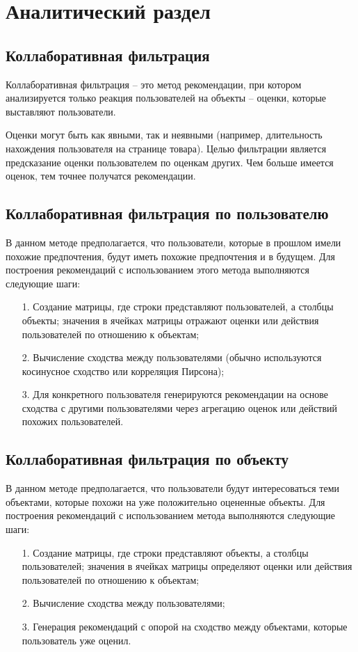 \section{Аналитический раздел}

\subsection{Коллаборативная фильтрация}

Коллаборативная фильтрация -- это метод рекомендации, при котором анализируется только реакция пользователей на объекты -- оценки, которые выставляют пользователи. \cite{collabFilter}

Оценки могут быть как явными, так и неявными (например, длительность нахождения пользователя на странице товара). Целью фильтрации является предсказание оценки пользователем по оценкам других. Чем больше имеется оценок, тем точнее получатся рекомендации. \cite{collabFilter} 

\subsection{Коллаборативная фильтрация по пользователю}

В данном методе предполагается, что пользователи, которые в прошлом имели похожие предпочтения, будут иметь похожие предпочтения и в будущем. Для построения рекомендаций с использованием этого метода выполняются следующие шаги:

\begin{enumerate}
	\item[1.] Создание матрицы, где строки представляют пользователей, а столбцы объекты; значения в ячейках матрицы отражают оценки или действия пользователей по отношению к объектам;
	\item[2.] Вычисление сходства между пользователями (обычно используются косинусное сходство или корреляция Пирсона);
	\item[3.] Для конкретного пользователя генерируются рекомендации на основе сходства с другими пользователями через агрегацию оценок или действий похожих пользователей.
\end{enumerate}

\subsection{Коллаборативная фильтрация по объекту}

В данном методе предполагается, что пользователи будут интересоваться теми объектами, которые похожи на уже положительно оцененные объекты. Для построения рекомендаций с использованием метода выполняются следующие шаги:

\begin{enumerate}
	\item[1.] Создание матрицы, где строки представляют объекты, а столбцы пользователей; значения в ячейках матрицы определяют оценки или действия пользователей по отношению к объектам;
	\item[2.] Вычисление сходства между пользователями;
	\item[3.] Генерация рекомендаций с опорой на сходство между объектами, которые пользователь уже оценил. 
\end{enumerate}
\pagebreak